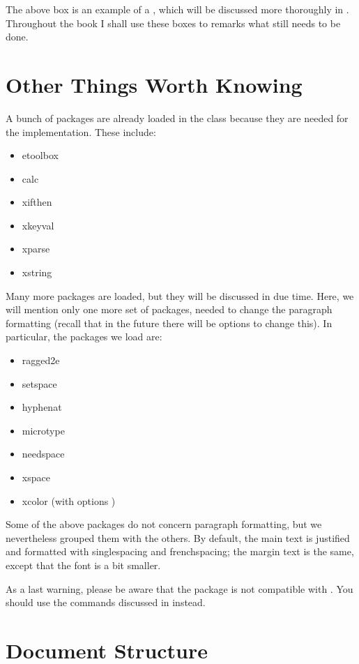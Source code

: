 The above box is an example of a , which will be 
discussed more thoroughly in . Throughout the book I 
shall use these boxes to remarks what still needs to be done.

\section{Other Things Worth Knowing}

A bunch of packages are already loaded in the class because they are 
needed for the implementation. These include:

\begin{itemize}
    \item etoolbox
    \item calc
    \item xifthen
    \item xkeyval
    \item xparse
    \item xstring
\end{itemize}

Many more packages are loaded, but they will be discussed in due time. 
Here, we will mention only one more set of packages, needed to change 
the paragraph formatting (recall that in the future there will be 
options to change this). In particular, the packages we load are:

\begin{itemize}
    \item ragged2e
    \item setspace
    \item hyphenat
    \item microtype
    \item needspace
    \item xspace
    \item xcolor (with options )
\end{itemize}

Some of the above packages do not concern paragraph formatting, but we 
nevertheless grouped them with the others. By default, the main text is 
justified and formatted with singlespacing and frenchspacing; the margin 
text is the same, except that the font is a bit smaller.

As a last warning, please be aware that the  package 
is not compatible with . You should use the commands 
discussed in  instead.

\section{Document Structure}

